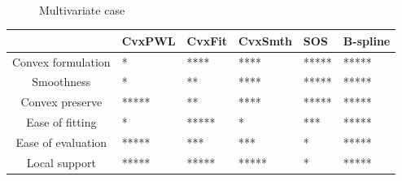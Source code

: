 \documentclass[10pt,twocolumn]{article}          %
\begin{document}
  \begin{figure}[ht]
    \centering
    \\
    \caption{Multivariate case}\label{fig:cvxfitnd}
  \end{figure}

  \begin{table}
   \begin{center}
    \begin{tabular}{c|l|l|l|l|l}
      \hline
      & \small{CvxPWL} & \small{CvxFit} & \small{CvxSmth} & \small{SOS} & \small{B-spline} \\
      \hline
      \small{Convex formulation} & *      & ****   & ****    & ***** & *****    \\
      \hline
      \small{Smoothness}     & *  & ** & **** & ***** & ***** \\
      \hline
      \small{Convex preserve} & ***** & ** & **** & ***** & ***** \\
      \hline
      \small{Ease of fitting} & * & ***** & * & *** & ***** \\
      \hline
      \small{Ease of evaluation} & ***** & *** & *** & * & ***** \\
      \hline
      \small{Local support} & ***** & ***** & ***** & * & ***** \\
      \hline
    \end{tabular}
   \end{center}
  \end{table}





\end{document}
